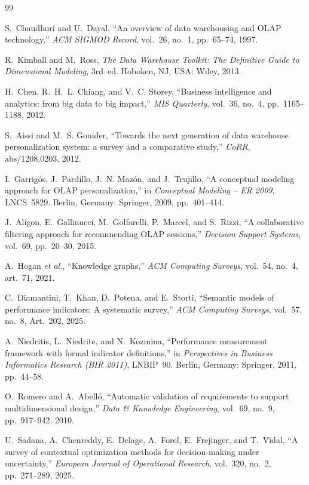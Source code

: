 \documentclass[journal]{IEEEtran}
\begin{document}
\begin{thebibliography}{99}

S.~Chaudhuri and U.~Dayal, ``An overview of data warehousing and OLAP technology,'' \emph{ACM SIGMOD Record}, vol.~26, no.~1, pp.~65--74, 1997.

R.~Kimball and M.~Ross, \emph{The Data Warehouse Toolkit: The Definitive Guide to Dimensional Modeling}, 3rd~ed. Hoboken, NJ, USA: Wiley, 2013.

H.~Chen, R.~H.~L. Chiang, and V.~C. Storey, ``Business intelligence and analytics: from big data to big impact,'' \emph{MIS Quarterly}, vol.~36, no.~4, pp.~1165--1188, 2012.

S.~Aissi and M.~S. Gouider, ``Towards the next generation of data warehouse personalization system: a survey and a comparative study,'' \emph{CoRR}, abs/1208.0203, 2012.

I.~Garrig\'os, J.~Pardillo, J.~N. Maz\'on, and J.~Trujillo, ``A conceptual modeling approach for OLAP personalization,'' in \emph{Conceptual Modeling -- ER 2009}, LNCS~5829. Berlin, Germany: Springer, 2009, pp.~401--414.

J.~Aligon, E.~Gallinucci, M.~Golfarelli, P.~Marcel, and S.~Rizzi, ``A collaborative filtering approach for recommending OLAP sessions,'' \emph{Decision Support Systems}, vol.~69, pp.~20--30, 2015.

A.~Hogan \emph{et al.}, ``Knowledge graphs,'' \emph{ACM Computing Surveys}, vol.~54, no.~4, art.~71, 2021.

C.~Diamantini, T.~Khan, D.~Potena, and E.~Storti, ``Semantic models of performance indicators: A systematic survey,'' \emph{ACM Computing Surveys}, vol.~57, no.~8, Art.~202, 2025.

A.~Niedritis, L.~Niedrite, and N.~Kozmina, ``Performance measurement framework with formal indicator definitions,'' in \emph{Perspectives in Business Informatics Research (BIR 2011)}, LNBIP~90. Berlin, Germany: Springer, 2011, pp.~44--58.

O.~Romero and A.~Abell\'o, ``Automatic validation of requirements to support multidimensional design,'' \emph{Data \& Knowledge Engineering}, vol.~69, no.~9, pp.~917--942, 2010.

U.~Sadana, A.~Chenreddy, E.~Delage, A.~Forel, E.~Frejinger, and T.~Vidal, ``A survey of contextual optimization methods for decision-making under uncertainty,'' \emph{European Journal of Operational Research}, vol.~320, no.~2, pp.~271--289, 2025.


\end{thebibliography}
\end{document}
